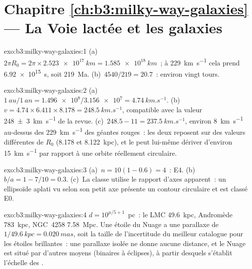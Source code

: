 \section*{Chapitre \ref{ch:b3:milky-way-galaxies} --- La Voie lactée et les galaxies}

\begin{solution}{exo:b3:milky-way-galaxies:1}
(a)~$2\pi R_0 = 2\pi\times\qty{2.523e17}{km} = \qty{1.585e18}{km}$~; à
\qty{229}{km.s^{-1}} cela prend \qty{6.92e15}{s}, soit
\qty{219}{Ma}. (b)~$4540/219 = 20.7$~: environ vingt tours.
\end{solution}

\begin{solution}{exo:b3:milky-way-galaxies:2}
(a)~$\qty{1}{au}/\qty{1}{an} = \num{1.496e8}/\num{3.156e7} =
\qty{4.74}{km.s^{-1}}$. (b)~$v = 4.74\times6.411\times8.178 =
\qty{248.5}{km.s^{-1}}$, compatible avec la valeur
\qty[separate-uncertainty=true]{248 \pm 3}{km.s^{-1}} de la revue. (c)~$248.5 - 11 = \qty{237.5}{km.s^{-1}}$,
environ \qty{8}{km.s^{-1}} au-dessus des \qty{229}{km.s^{-1}} des géantes rouges~:
les deux reposent sur des valeurs différentes de $R_0$ (8.178 et \qty{8.122}{kpc}),
et le  peut lui-même dériver d'environ \qty{15}{km.s^{-1}} par rapport
à une orbite réellement circulaire.
\end{solution}

\begin{solution}{exo:b3:milky-way-galaxies:3}
(a)~$n = 10(1 - 0.6) = 4$~: E4. (b)~$b/a = 1 - 7/10 = 0.3$. (c)~La classe
utilise le rapport d'axes apparent~: un ellipsoïde aplati vu selon son petit
axe présente un contour circulaire et est classé E0.
\end{solution}

\begin{solution}{exo:b3:milky-way-galaxies:4}
$d = 10^{\mu/5 + 1}$~pc~: le LMC \qty{49.6}{kpc}, Andromède
\qty{783}{kpc}, NGC~4258 \qty{7.58}{Mpc}. Une étoile du Nuage a une
parallaxe de $1/\qty{49.6}{kpc} = \qty{0.020}{mas}$, soit la taille de
l'incertitude du meilleur catalogue pour les étoiles brillantes~: une parallaxe isolée ne donne
aucune distance, et le Nuage est situé par d'autres moyens (binaires
à éclipses), à partir desquels s'établit l'échelle des .
\end{solution}

